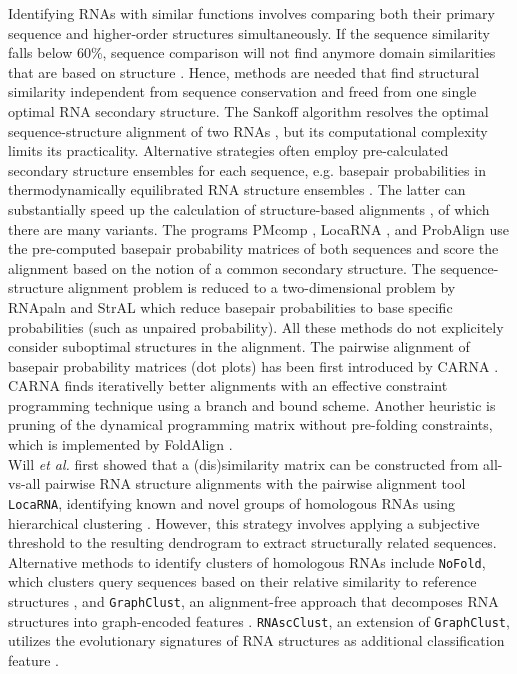 \documentclass{bmcart}
\newcommand\graphclust{\texttt{GraphClust}}
\newcommand\locarna{\texttt{LocaRNA}}
\newcommand\nofold{\texttt{NoFold}}
\begin{document}
Identifying RNAs with similar functions involves comparing both their primary
sequence and higher-order structures simultaneously. If the sequence similarity
falls below 60\%, sequence comparison will not find anymore domain similarities
that are based on structure \cite{Gardner15860779}. Hence, methods are needed
that find structural similarity independent from sequence conservation and
freed from one single optimal RNA secondary structure. The Sankoff algorithm
resolves the optimal sequence-structure alignment of two RNAs \cite{sankoff85},
but its computational complexity limits its practicality. Alternative
strategies often employ pre-calculated secondary structure ensembles for each
sequence, e.g. basepair probabilities in thermodynamically equilibrated RNA
structure ensembles \cite{McCaskill:1990}. The latter can substantially speed
up the calculation of structure-based alignments \cite{Hofacker15073017}, of
which there are many variants.  The programs PMcomp \cite{Hofacker15073017},
LocaRNA \cite{Will17432929}, and ProbAlign \cite{Roshan16954142} use the pre-computed
basepair probability matrices of both sequences and score the alignment based
on the notion of a common secondary structure. The sequence-structure alignment
problem is reduced to a two-dimensional problem by RNApaln \cite{Lorenz22115189} and
StrAL \cite{Dalli16613908} which reduce basepair probabilities to base
specific probabilities (such as unpaired probability). All these methods do not
explicitely consider suboptimal structures in the alignment. The pairwise
alignment of basepair probability matrices (dot plots) has been first
introduced by CARNA \cite{Palu2010,Sorescu2012}. CARNA finds
iterativelly better alignments with an effective constraint programming
technique using a branch and bound scheme. Another heuristic is pruning
of the dynamical programming matrix without pre-folding constraints, which is
implemented by FoldAlign \cite{Havgaard17937495,Sundfeld26704597}. \\ 

Will \textit{et al.} \cite{Will17432929} first showed that a (dis)similarity matrix can be constructed from all-vs-all pairwise RNA structure alignments with the pairwise alignment tool \locarna{}, identifying known and novel groups of homologous RNAs using hierarchical clustering \cite{Will17432929}. However, this strategy involves applying a subjective threshold to the resulting dendrogram to extract structurally related sequences. Alternative methods to identify clusters of homologous RNAs include \nofold, which clusters query sequences based on their relative similarity to reference structures \cite{Middleton25234928}, and \graphclust{}, an alignment-free approach that decomposes RNA structures into graph-encoded features \cite{Heyne22689765}. \texttt{RNAscClust}, an extension of \graphclust{}, utilizes the evolutionary signatures of RNA structures as additional classification feature \cite{Miladi28334186}. \\
\end{document}
